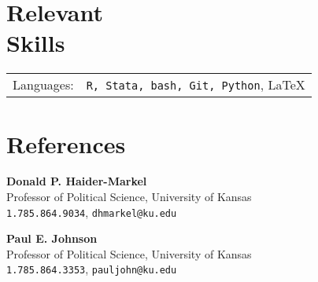 \documentclass[margin,line,pifont,palatino,courier]{res}
\begin{document}
\begin{resume}

\section{\sc Relevant \\ Skills}

\begin{tabular}{@{}p{0.8in}p{6in}}

Languages:& \verb+R, Stata, bash, Git, Python+, \LaTeX   \\

\end{tabular}










\section{\sc References}

{\bf Donald P. Haider-Markel} \\
Professor of Political Science, University of Kansas \\
\verb+1.785.864.9034+, \texttt{dhmarkel@ku.edu}

{\bf Paul E. Johnson} \\
Professor of Political Science, University of Kansas \\
\verb+1.785.864.3353+, \texttt{pauljohn@ku.edu}
\end{resume}
\end{document}
